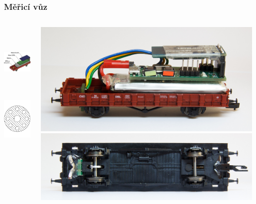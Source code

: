 \documentclass[aspectratio=169]{beamer}
\begin{document}

\begin{frame}
\frametitle{Měřicí vůz}
\begin{columns}
	\begin{center}
	\includegraphics[height=10em]{data/wsm-3d.png}
	\includegraphics[align=c,angle=90,height=6em]{data/Kolo_pres_TT.pdf}
	\end{center}
	\pause
	\includegraphics[width=\columnwidth]{data/wsm-3d.jpg}
	\includegraphics[width=\columnwidth]{data/wsm-bot.jpg}
\end{columns}
\end{frame}

\end{document}
